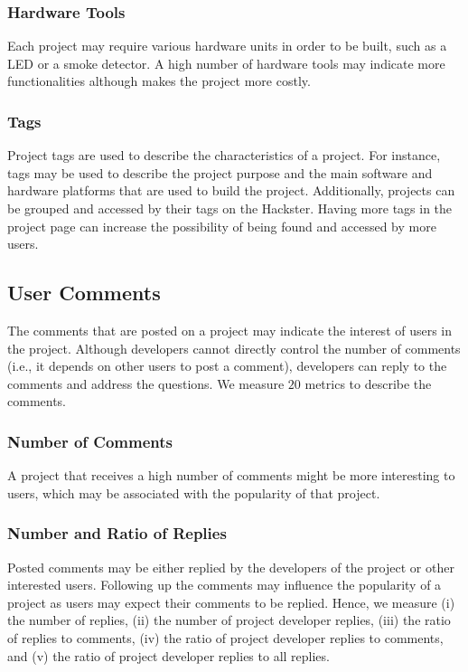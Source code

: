 \subsubsection*{Hardware Tools} Each project may require various hardware units in order to be built, such as a LED or a smoke detector. A high number of hardware tools may indicate more functionalities although makes the project more costly.

\subsubsection*{Tags} Project tags are used to describe the characteristics of a project.
For instance, tags may be used to describe the project purpose and the main software and hardware platforms that are used to build the project. Additionally, projects can be grouped and accessed by their tags on the Hackster. Having more tags in the project page can increase the possibility of being found and accessed by more users.

\subsection{User Comments}

The comments that are posted on a project may indicate the interest of users in the project. Although developers cannot directly control the number of comments (i.e., it depends on other users to post a comment), developers can reply to the comments and address the questions. We measure $20$ metrics to describe the comments.

\subsubsection*{Number of Comments} A project that receives a high number of comments might be more interesting to users, which may be associated with the popularity of that project.

\subsubsection*{Number and Ratio of Replies}
Posted comments may be either replied by the developers of the project or other interested users.
Following up the comments may influence the popularity of a project as users may expect their comments to be replied. Hence, we measure (i) the number of replies, (ii) the number of project developer replies, (iii) the ratio of replies to comments, (iv) the ratio of project developer replies to comments, and (v) the ratio of project developer replies to all replies.

